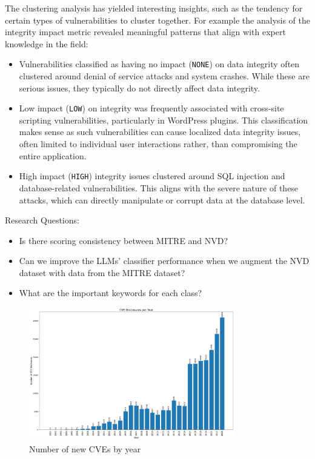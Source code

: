\documentclass[12pt]{article}
\begin{document}
The clustering analysis has yielded interesting insights, such as the tendency for certain types of
vulnerabilities to cluster together. For example the analysis of the integrity impact metric revealed meaningful patterns that align with expert knowledge in the field:

\begin{itemize}

	\item Vulnerabilities classified as having no impact (\texttt{NONE}) on data integrity often
	      clustered around denial of service attacks and system crashes. While these are serious
	      issues, they typically do not directly affect data integrity.

	\item Low impact (\texttt{LOW}) on integrity was frequently associated with cross-site scripting
	      vulnerabilities, particularly in WordPress plugins. This classification makes sense as such
	      vulnerabilities can cause localized data integrity issues, often limited to individual user
	      interactions rather, than compromising the entire application.

	\item High impact (\texttt{HIGH}) integrity issues clustered around SQL injection and
	      database-related vulnerabilities. This aligns with the severe nature of these attacks, which
	      can directly manipulate or corrupt data at the database level.

\end{itemize}

Research Questions:

\begin{itemize}
	\item Is there scoring consistency between MITRE and NVD?

	\item Can we improve the LLMs' classifier performance when we augment the NVD dataset with data
	      from the MITRE dataset?

	\item What are the important keywords for each class?
\end{itemize}



\begin{figure}[ht] \centering
	\includegraphics[width=0.8\textwidth]{figures/cves_per_year.pdf}
	\caption{\label{fig:cves_per_year}Number of new CVEs by year}
\end{figure}
\end{document}
